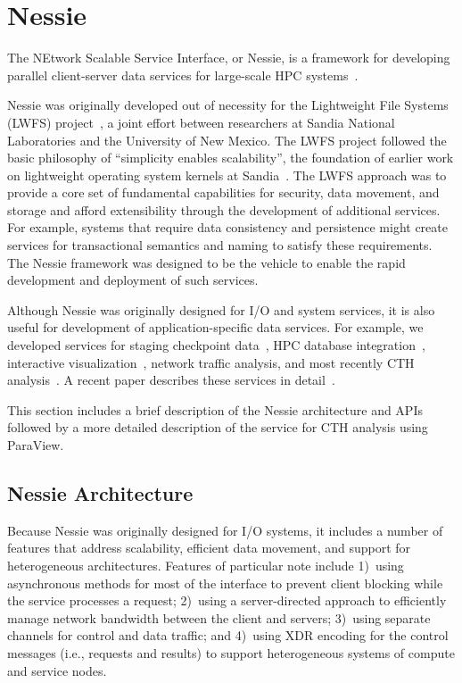\section{Nessie}
\label{sec:Nessie}

The NEtwork Scalable Service Interface, or Nessie, is a framework for developing
parallel client-server data services for large-scale HPC
systems~\cite{lofstead:2011:nessie-staging,oldfield:lwfs-data-movement,oldfield:2012:uGNI}. 

Nessie was originally developed out of necessity for the Lightweight File
Systems (LWFS) project~\cite{oldfield:lwfs}, a joint effort between researchers
at Sandia National Laboratories and the University of New Mexico. The LWFS
project followed the basic philosophy of ``simplicity enables scalability'',
the foundation of earlier work on lightweight operating system kernels at
Sandia~\cite{riesen:ccpe-lwk}. The LWFS approach was to provide a core set of
fundamental capabilities for security, data movement, and storage and afford
extensibility through the development of additional services. For example,
systems that require data consistency and persistence might create services for
transactional semantics and naming to satisfy these requirements. The Nessie
framework was designed to be the vehicle to enable the rapid development and 
deployment of such services.  


Although Nessie was originally designed for I/O and system services, it is also
useful for development of application-specific data services.  For example, 
we developed services for staging checkpoint
data~\cite{oldfield:ft-ldrd-tr,reiss:checkpoint-proxy,oldfield:modeling_checkpoints},
HPC database integration~\cite{oldfield:sql-proxy}, interactive
visualization~\cite{oldfield:multilingual-siam}, network traffic analysis, and 
most recently CTH \intransit analysis~\cite{moreland:2011:in-transit}.  A recent
paper describes these services in detail~\cite{lofstead:2013:data-staging}.


This section includes a brief description of the Nessie architecture and APIs followed
by a more detailed description of the \intransit service for CTH analysis using 
ParaView.  


\subsection{Nessie Architecture}

Because Nessie was originally designed for I/O systems, it includes a number of
features that address scalability, efficient data movement, and support for
heterogeneous architectures. Features of particular note include 1)~using
asynchronous methods for most of the interface to prevent client blocking while
the service processes a request; 2)~using a server-directed approach to
efficiently manage network bandwidth between the client and servers; 3)~using
separate channels for control and data traffic; and 4)~using XDR encoding for
the control messages (i.e., requests and results) to support heterogeneous
systems of compute and service nodes.

